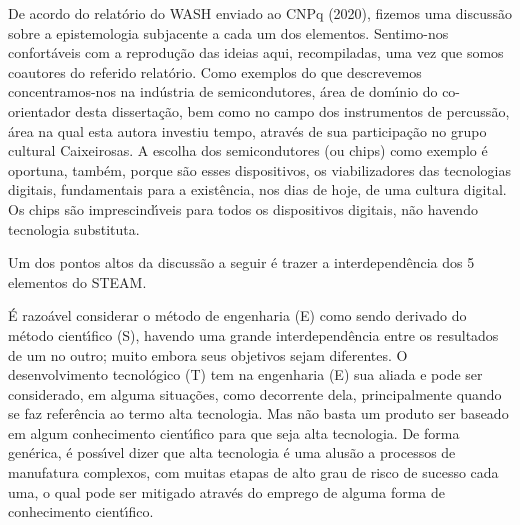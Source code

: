 \documentclass[
12pt,		%
openright,	%
twoside,  %
a4paper,			%
chapter=TITLE,		%
english,			%
french,				%
spanish,			%
brazil				%
]{USPSC-classe/USPSC}
\begin{document}
De acordo do relat\'orio do WASH enviado ao CNPq (2020), fizemos uma discuss\~ao sobre a epistemologia subjacente a cada um dos elementos. Sentimo-nos confort\'aveis com a reprodu\c{c}\~ao das ideias aqui, recompiladas, uma vez que somos coautores do referido relat\'orio. Como exemplos do que descrevemos concentramos-nos na ind\'ustria de semicondutores, \'area de dom\'{\i}nio do co-orientador desta disserta\c{c}\~ao, bem como no campo dos instrumentos de percuss\~ao, \'area na qual esta autora investiu tempo, atrav\'es de sua participa\c{c}\~ao no grupo cultural \textquotedbl Caixeirosas\textquotedbl . A escolha dos semicondutores (ou chips) como exemplo \'e oportuna, tamb\'em, porque s\~ao esses dispositivos, os viabilizadores das tecnologias digitais, fundamentais para a exist\^encia, nos dias de hoje, de uma \textquotedbl cultura digital\textquotedbl . Os chips s\~ao imprescind\'{\i}veis para todos os dispositivos digitais, n\~ao havendo tecnologia substituta.








Um dos pontos altos da discuss\~ao a seguir \'e trazer a interdepend\^encia dos 5 elementos do STEAM.








\'E razo\'avel considerar o m\'etodo de engenharia (E) como sendo derivado do m\'etodo cient\'{\i}fico (S), havendo uma grande interdepend\^encia entre os resultados de um no outro; muito embora seus objetivos sejam diferentes. O desenvolvimento tecnol\'ogico (T) tem na engenharia (E) sua aliada e pode ser considerado, em alguma situa\c{c}\~oes, como decorrente dela, principalmente quando se faz refer\^encia ao termo \textquotedbl alta tecnologia\textquotedbl . Mas n\~ao basta um produto ser baseado em algum conhecimento cient\'{\i}fico para que seja alta tecnologia. De forma gen\'erica, \'e poss\'{\i}vel dizer que \textquotedbl alta tecnologia \textquotedbl  \'e uma alus\~ao a processos de manufatura complexos, com muitas etapas de alto grau de risco de sucesso cada uma, o qual pode ser mitigado atrav\'es do emprego de alguma forma de conhecimento cient\'{\i}fico.
\end{document}
